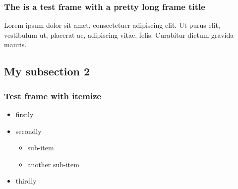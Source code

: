 \documentclass[pdflatex,compress]{beamer}
\begin{document}


\begin{frame}

\frametitle{The is a test frame with a pretty long frame title}
Lorem ipsum dolor sit amet, consectetuer adipiscing elit. Ut purus
elit, vestibulum ut, placerat ac, adipiscing vitae, felis. Curabitur
dictum gravida mauris.

\end{frame}

\subsection{My subsection 2}
\begin{frame}
\frametitle{Test frame with itemize}

\begin{itemize}
    \item<1-> firstly
    \item<2-> secondly
        \begin{itemize}
            \item sub-item
            \item another sub-item
        \end{itemize}
      \item<3-> thirdly
\end{itemize}

\end{frame}
\end{document}
